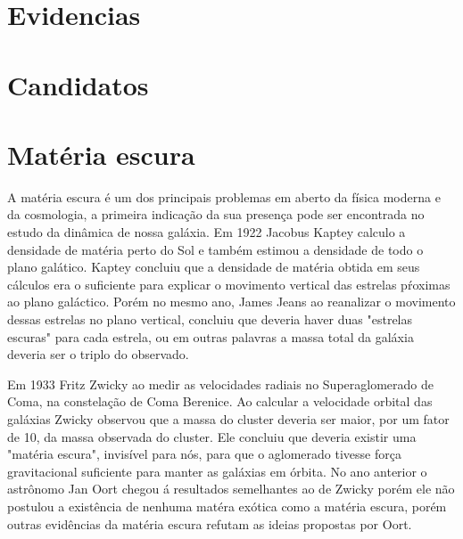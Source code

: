 \documentclass[
	article,			%
	11pt,				%
	twoside,			%
	a4paper,			%
	english,			%
	brazil,				%
	sumario=tradicional
	]{abntex2}
\begin{document}
\section{Evidencias}
\section{Candidatos}

\section{Matéria escura}

A matéria escura é um dos principais problemas em aberto da física moderna e da cosmologia, a primeira indicação da sua presença
pode ser encontrada no estudo da dinâmica de nossa galáxia. Em 1922 Jacobus Kaptey calculo a densidade
de matéria perto do Sol e também estimou a densidade de todo o plano galático\cite{1922ApJ55302K}. Kaptey concluiu que a densidade
de matéria obtida em seus cálculos era o suficiente para explicar o movimento vertical das estrelas pŕoximas ao plano galáctico. Porém no mesmo ano, James Jeans
ao reanalizar o movimento dessas estrelas no plano vertical, concluiu que deveria haver duas "estrelas escuras" para cada estrela\cite{10.1093/mnras/82.3.122}, ou em outras palavras a massa total
da galáxia deveria ser o triplo do observado.

Em 1933 Fritz Zwicky ao medir as velocidades radiais no Superaglomerado de Coma, na constelação de Coma Berenice. Ao calcular a velocidade orbital das galáxias
Zwicky observou que a massa do cluster deveria ser maior, por um fator de 10, da massa observada do cluster\cite{1933AcHPh...6..110Z}. Ele concluiu que deveria existir uma
"matéria escura", invisível para nós, para que o aglomerado tivesse força gravitacional suficiente para manter as galáxias em órbita. No ano anterior o astrônomo
Jan Oort chegou á resultados semelhantes ao de Zwicky porém ele não postulou a existência de nenhuma matéra exótica como a matéria escura, porém outras evidências
da matéria escura refutam as ideias propostas por Oort.
\end{document}

